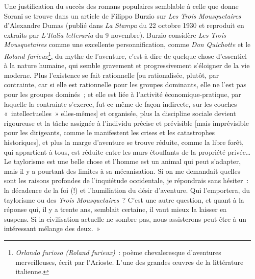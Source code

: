\documentclass[french,twoside]{book} %
\begin{document}
Une justification du succès des romans populaires semblable à celle que donne Sorani se trouve dans un article de Filippo Burzio sur \emph{Les Trois Mousquetaires} d’Alexandre Dumas (publié dans \emph{La Stampa} du 22 octobre 1930 et reproduit en extraits par \emph{L'Italia letteraria} du 9 novembre). Burzio considère \emph{Les Trois Mousquetaires} comme une excellente personnification, comme \emph{Don Quichotte} et le \emph{Roland furieux}\footnote{\emph{Orlando furioso (Roland furieux)} : poème chevaleresque d’aventures merveilleuses, écrit par l’Arioste. L'une des grandes œuvres de la littérature italienne.}, du mythe de l’aventure, c’est-à-dire de quelque chose d’essentiel à la nature humaine, qui semble gravement et progressivement s’éloigner de la vie moderne. Plus l’existence se fait rationnelle [ou rationalisée, plutôt, par contrainte, car si elle est rationnelle pour les groupes dominants, elle ne l’est pas pour les groupes dominés ; et elle est liée à l’activité économique-pratique, par laquelle la contrainte s’exerce, fut-ce même de façon indirecte, sur les couches « intellectuelles » elles-mêmes] et organisée, plus la discipline sociale devient rigoureuse et la tâche assignée à l’individu précise et prévisible [mais imprévisible pour les dirigeants, comme le manifestent les crises et les catastrophes historiques], et plus la marge d’aventure se trouve réduite, comme la libre forêt, qui appartient à tous, est réduite entre les murs étouffants de la propriété privée… Le taylorisme est une belle chose et l’homme est un animal qui peut s’adapter, mais il y a pourtant des limites à sa mécanisation. Si on me demandait quelles sont les raisons profondes de l’inquiétude occidentale, je répondrais sans hésiter : la décadence de la foi (!) et l’humiliation du désir d’aventure. Qui l’emportera, du taylorisme ou des \emph{Trois Mousquetaires} ? C'est une autre question, et quant à la réponse qui, il y a trente ans, semblait certaine, il vaut mieux la laisser en suspens. Si la civilisation actuelle ne sombre pas, nous assisterons peut-être à un intéressant mélange des deux. »\par
\end{document}
